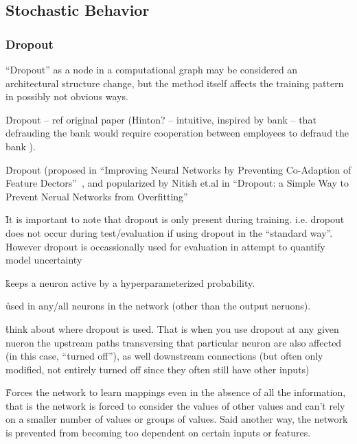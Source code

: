 

\subsection{Stochastic Behavior}

\subsubsection{Dropout}

\r{``Dropout'' as a node in a computational graph may be considered an architectural structure change, but the method itself affects the training pattern in possibly not obvious ways. }


\r{Dropout -- ref original paper (Hinton? -- intuitive, inspired by bank -- that defrauding the bank would require cooperation between employees to defraud the bank )}.

\r{Dropout (proposed in ``Improving Neural Networks by Preventing Co-Adaption of Feature Dectors''~\cite{DBLP:journals/corr/abs-1207-0580}, and popularized by Nitish et.al in ``Dropout: a Simple Way to Prevent Nerual Networks from Overfitting''~\cite{JMLR:v15:srivastava14a}}

\r{It is important to note that dropout is only present during training. i.e. dropout does not occur during test/evaluation if using dropout in the ``standard way''. However dropout is occassionally used for evaluation in attempt to quantify model uncertainty }

\r{keeps a neuron active by a hyperparameterized probability.}

\r{used in any/all neurons in the network (other than the output neruons).}

\r{think about where dropout is used. That is when you use dropout at any given nueron the upstream paths transversing that particular neuron are also affected (in this case, ``turned off''), as well downstream connections (but often only modified, not entirely turned off since they often still have other inputs) }

\r{Forces the network to learn mappings even in the absence of all the information, that is the network is forced to consider the values of other values and can't rely on a smaller number of values or groups of values. Said another way, the network is prevented from becoming too dependent on certain inputs or features.}

